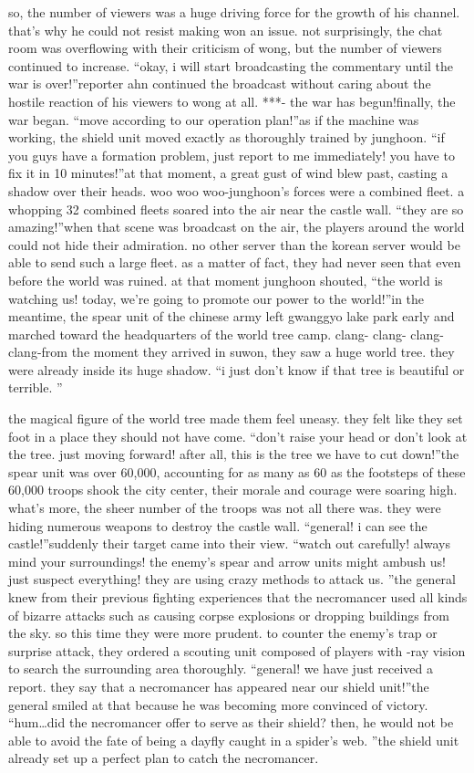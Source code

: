  so, the number of viewers was a huge driving force for the growth of his channel.
 that’s why he could not resist making won an issue.
not surprisingly, the chat room was overflowing with their criticism of wong, but the number of viewers continued to increase.
“okay, i will start broadcasting the commentary until the war is over!”reporter ahn continued the broadcast without caring about the hostile reaction of his viewers to wong at all.
***- the war has begun!finally, the war began.
“move according to our operation plan!”as if the machine was working, the shield unit moved exactly as thoroughly trained by junghoon.
“if you guys have a formation problem, just report to me immediately! you have to fix it in 10 minutes!”at that moment, a great gust of wind blew past, casting a shadow over their heads.
woo woo woo-junghoon’s forces were a combined fleet.
 a whopping 32 combined fleets soared into the air near the castle wall.
“they are so amazing!”when that scene was broadcast on the air, the players around the world could not hide their admiration.
 no other server than the korean server would be able to send such a large fleet.
 as a matter of fact, they had never seen that even before the world was ruined.
at that moment junghoon shouted, “the world is watching us! today, we’re going to promote our power to the world!”in the meantime, the spear unit of the chinese army left gwanggyo lake park early and marched toward the headquarters of the world tree camp.
clang- clang- clang- clang-from the moment they arrived in suwon, they saw a huge world tree.
 they were already inside its huge shadow.
“i just don’t know if that tree is beautiful or terrible.
”

the magical figure of the world tree made them feel uneasy.
 they felt like they set foot in a place they should not have come.
“don’t raise your head or don’t look at the tree.
 just moving forward! after all, this is the tree we have to cut down!”the spear unit was over 60,000, accounting for as many as 60%
as the footsteps of these 60,000 troops shook the city center, their morale and courage were soaring high.
what’s more, the sheer number of the troops was not all there was.
 they were hiding numerous weapons to destroy the castle wall.
“general! i can see the castle!”suddenly their target came into their view.
“watch out carefully! always mind your surroundings! the enemy’s spear and arrow units might ambush us! just suspect everything! they are using crazy methods to attack us.
”the general knew from their previous fighting experiences that the necromancer used all kinds of bizarre attacks such as causing corpse explosions or dropping buildings from the sky.
so this time they were more prudent.
 to counter the enemy’s trap or surprise attack, they ordered a scouting unit composed of players with -ray vision to search the surrounding area thoroughly.
“general! we have just received a report.
 they say that a necromancer has appeared near our shield unit!”the general smiled at that because he was becoming more convinced of victory.
“hum…did the necromancer offer to serve as their shield? then, he would not be able to avoid the fate of being a dayfly caught in a spider’s web.
”the shield unit already set up a perfect plan to catch the necromancer.


 
